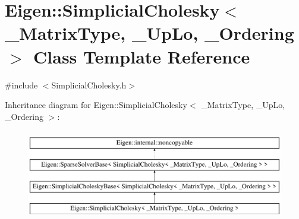 \hypertarget{class_eigen_1_1_simplicial_cholesky}{}\section{Eigen\+::Simplicial\+Cholesky$<$ \+\_\+\+Matrix\+Type, \+\_\+\+Up\+Lo, \+\_\+\+Ordering $>$ Class Template Reference}
\label{class_eigen_1_1_simplicial_cholesky}


{\ttfamily \#include $<$Simplicial\+Cholesky.\+h$>$}

Inheritance diagram for Eigen\+::Simplicial\+Cholesky$<$ \+\_\+\+Matrix\+Type, \+\_\+\+Up\+Lo, \+\_\+\+Ordering $>$\+:\begin{figure}[H]
\begin{center}
\leavevmode
\includegraphics[height=4.000000cm]{class_eigen_1_1_simplicial_cholesky}
\end{center}
\end{figure}
